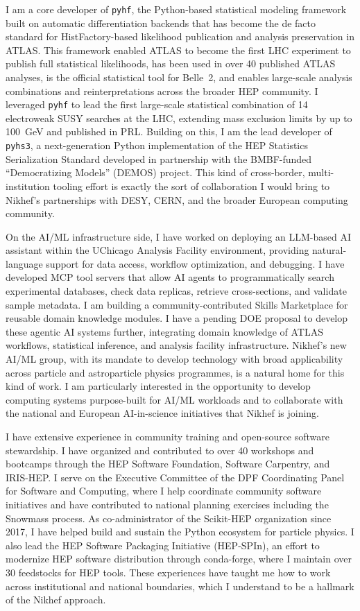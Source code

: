 \documentclass[10pt,letterpaper,sans]{moderncv} %
\begin{document}
I am a core developer of \texttt{pyhf}, the Python-based statistical modeling framework built on automatic differentiation backends that has become the de facto standard for HistFactory-based likelihood publication and analysis preservation in ATLAS. This framework enabled ATLAS to become the first LHC experiment to publish full statistical likelihoods, has been used in over 40 published ATLAS analyses, is the official statistical tool for Belle~2, and enables large-scale analysis combinations and reinterpretations across the broader HEP community. I leveraged \texttt{pyhf} to lead the first large-scale statistical combination of 14 electroweak SUSY searches at the LHC, extending mass exclusion limits by up to 100~GeV and published in PRL. Building on this, I am the lead developer of \texttt{pyhs3}, a next-generation Python implementation of the HEP Statistics Serialization Standard developed in partnership with the BMBF-funded ``Democratizing Models'' (DEMOS) project. This kind of cross-border, multi-institution tooling effort is exactly the sort of collaboration I would bring to Nikhef's partnerships with DESY, CERN, and the broader European computing community.

On the AI/ML infrastructure side, I have worked on deploying an LLM-based AI assistant within the UChicago Analysis Facility environment, providing natural-language support for data access, workflow optimization, and debugging. I have developed MCP tool servers that allow AI agents to programmatically search experimental databases, check data replicas, retrieve cross-sections, and validate sample metadata. I am building a community-contributed Skills Marketplace for reusable domain knowledge modules. I have a pending DOE proposal to develop these agentic AI systems further, integrating domain knowledge of ATLAS workflows, statistical inference, and analysis facility infrastructure. Nikhef's new AI/ML group, with its mandate to develop technology with broad applicability across particle and astroparticle physics programmes, is a natural home for this kind of work. I am particularly interested in the opportunity to develop computing systems purpose-built for AI/ML workloads and to collaborate with the national and European AI-in-science initiatives that Nikhef is joining.

I have extensive experience in community training and open-source software stewardship. I have organized and contributed to over 40 workshops and bootcamps through the HEP Software Foundation, Software Carpentry, and IRIS-HEP. I serve on the Executive Committee of the DPF Coordinating Panel for Software and Computing, where I help coordinate community software initiatives and have contributed to national planning exercises including the Snowmass process. As co-administrator of the Scikit-HEP organization since 2017, I have helped build and sustain the Python ecosystem for particle physics. I also lead the HEP Software Packaging Initiative (HEP-SPIn), an effort to modernize HEP software distribution through conda-forge, where I maintain over 30 feedstocks for HEP tools. These experiences have taught me how to work across institutional and national boundaries, which I understand to be a hallmark of the Nikhef approach.
\end{document}
